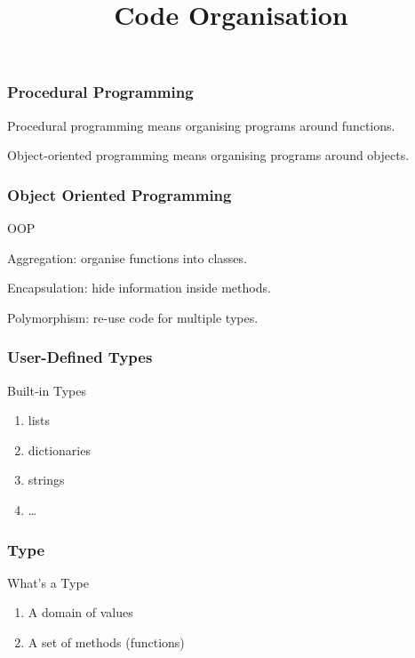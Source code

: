 
\title{Code Organisation}


\frame{\maketitle}

\begin{frame}[fragile]
\frametitle{Procedural Programming}
\alert{Procedural programming} means organising programs around functions.

\alert{Object-oriented programming} means organising programs around objects.
\end{frame}

\begin{frame}[fragile] 
\frametitle{Object Oriented Programming}

\begin{block}{OOP}
\begin{description}
\item Aggregation: organise functions into classes.
\item Encapsulation: hide information inside methods.
\item Polymorphism: re-use code for multiple types.
\end{description}
\end{block}
\end{frame}

\begin{frame}[fragile] 
\frametitle{User-Defined Types}

\begin{block}{Built-in Types}
\begin{enumerate}
\item lists
\item dictionaries
\item strings
\item \ldots
\end{enumerate}
\end{block}
\end{frame}

\begin{frame}[fragile] 
\frametitle{Type}
\begin{block}{What's a Type}
\begin{enumerate}
\item A domain of values
\item A set of methods (functions)
\end{enumerate}
\end{block}

\end{frame}

